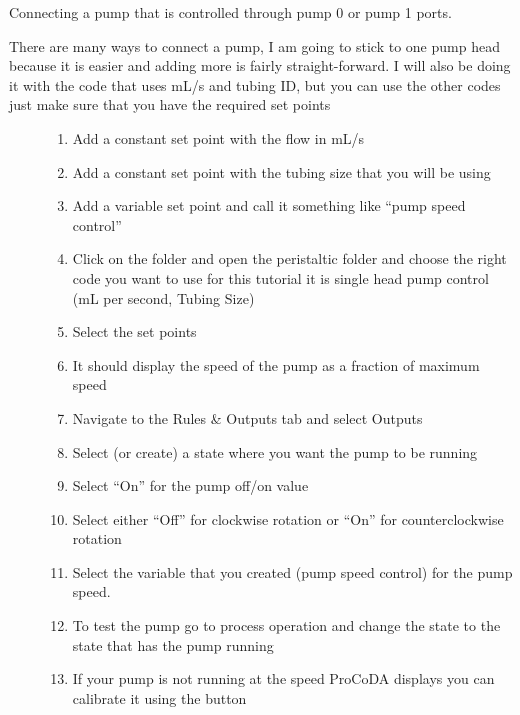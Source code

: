 \documentclass[letterpaper,10pt,english]{sphinxmanual}
\begin{document}
Connecting a pump that is controlled through pump 0 or pump 1 ports.
\begin{description}
\item[{There are many ways to connect a pump, I am going to stick to one pump head because it is easier and adding more is fairly straight-forward. I will also be doing it with the code that uses mL/s and tubing ID, but you can use the other codes just make sure that you have the required set points}] \leavevmode\begin{enumerate}
\item {} 
Add a constant set point with the flow in mL/s 

\item {} 
Add a constant set point with the tubing size that you will be using 

\item {} 
Add a variable set point and call it something like “pump speed control” 

\item {} 
Click on the folder and open the peristaltic folder and choose the right code you want to use for this tutorial it is single head pump control (mL per second, Tubing Size)

\item {} 
Select the set points

\item {} 
It should display the speed of the pump as a fraction of maximum speed

\item {} 
Navigate to the Rules \& Outputs tab and select Outputs 

\item {} 
Select (or create) a state where you want the pump to be running

\item {} 
Select “On” for the pump off/on value

\item {} 
Select either “Off” for clockwise rotation or “On” for counterclockwise rotation

\item {} 
Select the variable that you created (pump speed control) for the pump speed.

\item {} 
To test the pump go to process operation and change the state to the state that has the pump running

\item {} 
If your pump is not running at the speed ProCoDA displays you can calibrate it using the  button

\end{enumerate}

\end{description}
\end{document}
